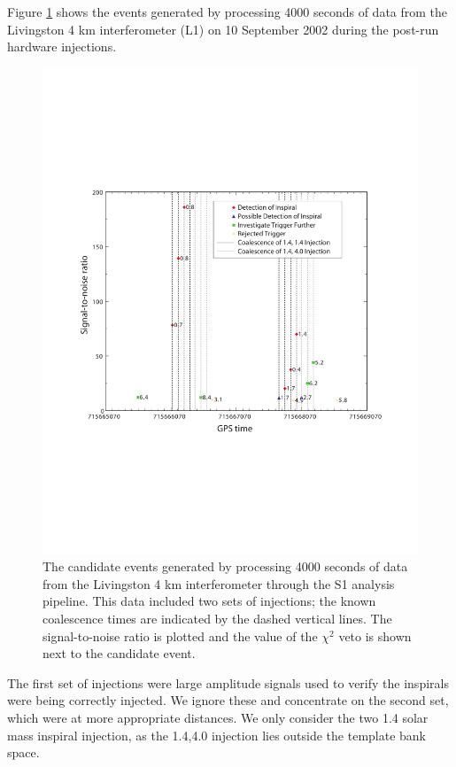 Figure \ref{f:inj_snr} shows the events generated by processing 4000 seconds
of data from the Livingston 4 km interferometer (L1) on 10 September 2002
during the post-run hardware injections.
\begin{figure}[htb]
  \vspace{5pt}
  \begin{flushright}
    \includegraphics[width=\textwidth]{figures/hardware/inj_snr}    
  \end{flushright}
  \caption{%
The candidate events generated by processing 4000 seconds of data from the
Livingston 4 km interferometer through the S1 analysis pipeline.  This data
included two sets of injections; the known coalescence times are indicated by
the dashed vertical lines. The signal-to-noise ratio is plotted and the value
of the $\chi^2$ veto is shown next to the candidate event.
  }
\label{f:inj_snr}
\end{figure}

The first set of injections were large amplitude signals used to verify the
inspirals were being correctly injected. We ignore these and concentrate on
the second set, which were at more appropriate distances.  We only consider
the two 1.4 solar mass inspiral injection, as the 1.4,4.0 injection lies
outside the template bank space.

